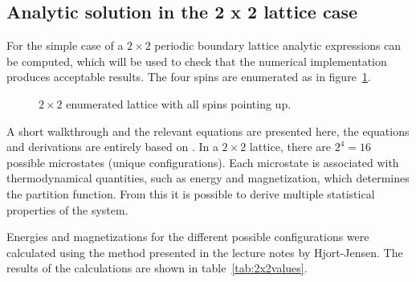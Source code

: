 \documentclass[aps,reprint]{revtex4-1}
\begin{document}
\subsection{Analytic solution in the 2 x 2 lattice case}
For the simple case of a $2 \times 2$ periodic boundary lattice analytic
expressions can be computed, which will be used to check that the numerical
implementation produces acceptable results. The four spins are enumerated as in
figure~\ref{fig:22lattice}.
\begin{figure}
  \centering
  \caption{$2 \times 2$ enumerated lattice with all spins pointing up.}
  \label{fig:22lattice}
\end{figure}
A short walkthrough and the relevant equations are presented here, the equations
and derivations are entirely based on \cite{mortenjensen}. In a $2 \times 2$
lattice, there are $2^4 = 16$ possible microstates (unique configurations). Each
microstate is associated with thermodynamical quantities, such as energy and
magnetization, which determines the partition function. From this it is possible
to derive multiple statistical properties of the system.

Energies and magnetizations for the different possible configurations were calculated
using the method presented in the lecture notes by Hjort-Jensen.
The results of the calculations are shown in table~\ref{tab:2x2values}.
\end{document}
